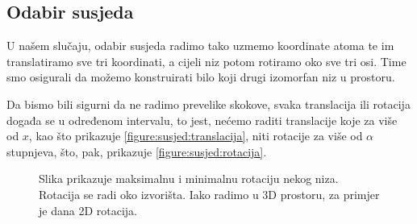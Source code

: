 \documentclass[times, utf8, zavrsni]{fer}
\begin{document}
\subsection{Odabir susjeda}
U našem slučaju, odabir susjeda radimo tako uzmemo koordinate atoma te
im translatiramo sve tri koordinati, a cijeli niz potom rotiramo oko sve tri
osi. Time smo osigurali da možemo konstruirati bilo koji drugi izomorfan niz u
prostoru.

Da bismo bili sigurni da ne radimo prevelike skokove, svaka translacija
ili rotacija događa se u određenom intervalu, to jest,
nećemo raditi translacije koje za više od $x$, kao što prikazuje \autoref{figure:susjed:translacija},
niti rotacije za više od
$\alpha$ stupnjeva, što, pak, prikazuje \autoref{figure:susjed:rotacija}.

\begin{figure}
\centering
{}
\caption[Rotacija nizova]{Slika prikazuje
maksimalnu i minimalnu rotaciju nekog niza. Rotacija se radi oko
izvorišta. Iako radimo u 3D prostoru, za primjer je dana 2D
rotacija.}
\label{figure:susjed:rotacija}
\end{figure}
\end{document}

